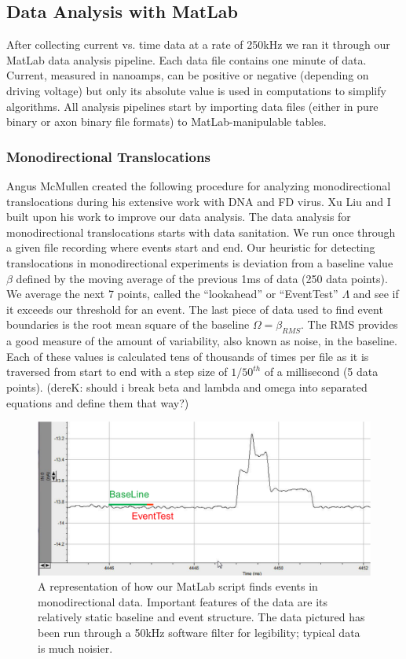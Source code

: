 \documentclass[aps,prl,preprint,groupedaddress]{revtex4}
\begin{document}
\subsection{Data Analysis with MatLab}

After collecting current vs. time data at a rate of 250kHz we ran it through our MatLab data analysis pipeline.
Each data file contains one minute of data.
Current, measured in nanoamps, can be positive or negative (depending on driving voltage) but only its absolute value is used in computations to simplify algorithms.
All analysis pipelines start by importing data files (either in pure binary or axon binary file formats) to MatLab-manipulable tables.

\subsubsection{Monodirectional Translocations}

Angus McMullen created the following procedure for analyzing monodirectional translocations during his extensive work with DNA and FD virus.
Xu Liu and I built upon his work to improve our data analysis.
The data analysis for monodirectional translocations starts with data sanitation.
We run once through a given file recording where events start and end.
Our heuristic for detecting translocations in monodirectional experiments is deviation from a baseline value \(\beta\) defined by the moving average of the previous 1ms of data (250 data points).
We average the next 7 points, called the ``lookahead'' or ``EventTest'' \(\Lambda\) and see if it exceeds our threshold for an event.
The last piece of data used to find event boundaries is the root mean square of the baseline \(\Omega = \beta_{RMS}\).
The RMS provides a good measure of the amount of variability, also known as noise, in the baseline.
Each of these values is calculated tens of thousands of times per file as it is traversed from start to end with a step size of \(1/50^{th}\) of a millisecond (5 data points). (dereK: should i break beta and lambda and omega into separated equations and define them that way?)

\begin{figure}
\centering
\includegraphics[width=1\textwidth]{figures/find-events}
\caption{A representation of how our MatLab script finds events in monodirectional data. Important features of the data are its relatively static baseline and event structure. The data pictured has been run through a 50kHz software filter for legibility; typical data is much noisier.}
\label{fig:find-events}
\end{figure}
\end{document}
